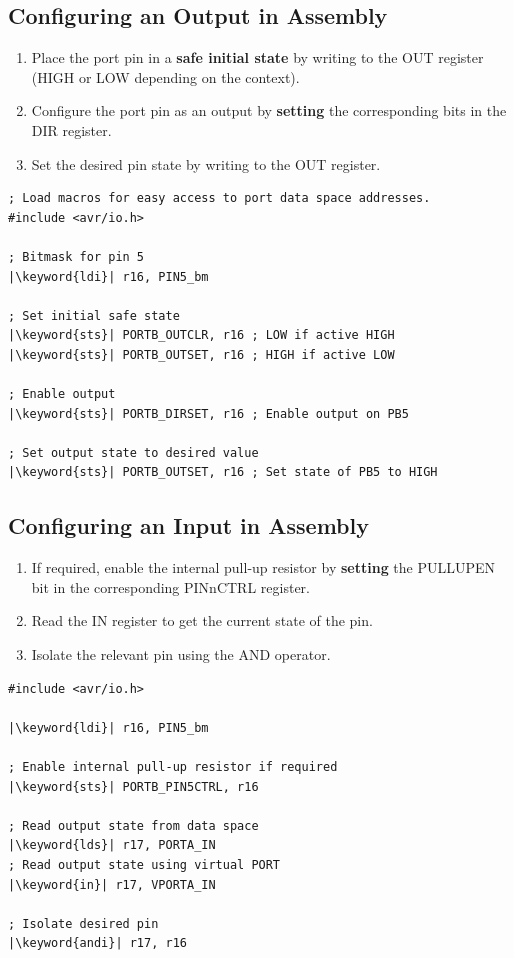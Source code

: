 \documentclass[a4paper]{report}
\newcommand{\keyword}[1]{\textcolor[rgb]{0.00,0.50,0.00}{\textbf{#1}}}
\begin{document}
\subsection{Configuring an Output in Assembly}
\begin{enumerate}
    \item Place the port pin in a \textbf{safe initial state}
          by writing to the OUT register (HIGH or LOW depending on the context).
    \item Configure the port pin as an output by \textbf{setting} the corresponding bits in the DIR register.
    \item Set the desired pin state by writing to the OUT register.
\end{enumerate}
\begin{verbatim}
; Load macros for easy access to port data space addresses.
#include <avr/io.h>

; Bitmask for pin 5
|\keyword{ldi}| r16, PIN5_bm

; Set initial safe state
|\keyword{sts}| PORTB_OUTCLR, r16 ; LOW if active HIGH
|\keyword{sts}| PORTB_OUTSET, r16 ; HIGH if active LOW

; Enable output
|\keyword{sts}| PORTB_DIRSET, r16 ; Enable output on PB5

; Set output state to desired value
|\keyword{sts}| PORTB_OUTSET, r16 ; Set state of PB5 to HIGH
\end{verbatim}
\subsection{Configuring an Input in Assembly}
\begin{enumerate}
    \item If required, enable the internal pull-up resistor by \textbf{setting}
          the PULLUPEN bit in the corresponding PINnCTRL register.
    \item Read the IN register to get the current state of the pin.
    \item Isolate the relevant pin using the AND operator.
\end{enumerate}
\begin{verbatim}
#include <avr/io.h>

|\keyword{ldi}| r16, PIN5_bm

; Enable internal pull-up resistor if required
|\keyword{sts}| PORTB_PIN5CTRL, r16

; Read output state from data space
|\keyword{lds}| r17, PORTA_IN
; Read output state using virtual PORT
|\keyword{in}| r17, VPORTA_IN

; Isolate desired pin
|\keyword{andi}| r17, r16
\end{verbatim}
\end{document}

